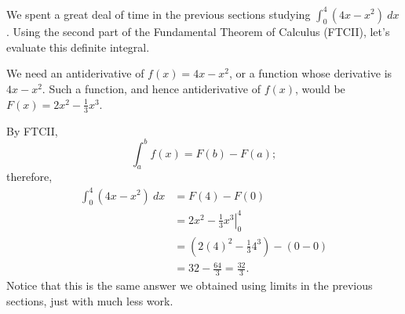 \begin{example} %
We spent a great deal of time in the previous sections studying $\int_0^4(4x-x^2)\ dx$. Using the second part of the Fundamental Theorem of Calculus (FTCII), let's evaluate this definite integral.

\solution We need an antiderivative of $f(x)=4x-x^2$, or a function whose derivative is $4x - x^2$.  Such a function, and hence antiderivative of $f(x)$, would be $F(x) = 2x^2 - \frac{1}{3}x^3$.

By FTCII,
\[ \int_a^b f(x) = F(b) - F(a); \] 
therefore,
\begin{align*}
\int_0^4 \left( 4x - x^2 \right) \ dx & = F(4) - F(0) \\
& = \left. 2x^2 - \frac{1}{3}x^3 \right|_0^4 \\
& = \left( 2(4)^2-\frac{1}{3}4^3 \right) - \left( 0 - 0 \right) \\
& =  32-\frac{64}{3} = \frac{32}{3}.
\end{align*}
Notice that this is the same answer we obtained using limits in the previous sections, just with much less work.
\end{example}